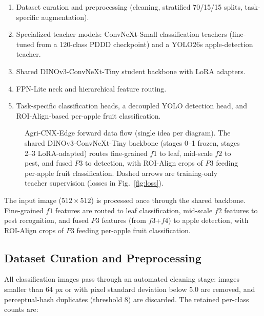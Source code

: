 \documentclass[preprint,12pt]{elsarticle}
\begin{document}
\begin{enumerate}

\item Dataset curation and preprocessing (cleaning, stratified
70/15/15 splits, task-specific augmentation).

\item Specialized teacher models: ConvNeXt-Small classification teachers
(fine-tuned from a 120-class PDDD checkpoint) and a YOLO26s
apple-detection teacher.

\item Shared DINOv3-ConvNeXt-Tiny student backbone with LoRA adapters.

\item FPN-Lite neck and hierarchical feature routing.

\item Task-specific classification heads, a decoupled YOLO detection
head, and ROI-Align-based per-apple fruit classification.

\end{enumerate}

\begin{figure}[H]
\centering
\resizebox{\textwidth}{!}{}
\caption{Agri-CNX-Edge forward data flow (single idea per diagram).
The shared DINOv3-ConvNeXt-Tiny backbone (stages 0--1 frozen, stages
2--3 LoRA-adapted) routes fine-grained $f1$ to leaf, mid-scale $f2$
to pest, and fused $P3$ to detection, with ROI-Align crops of $P3$
feeding per-apple fruit classification. Dashed arrows are
training-only teacher supervision (losses in Fig.~\ref{fig:loss}).}
\label{fig:arch}
\end{figure}

The input image ($512\times512$) is processed once through the shared
backbone. Fine-grained $f1$ features are routed to leaf classification,
mid-scale $f2$ features to pest recognition, and fused $P3$ features
(from $f3$+$f4$) to apple detection, with ROI-Align crops of $P3$
feeding per-apple fruit classification.


\subsection{Dataset Curation and Preprocessing}

All classification images pass through an automated cleaning stage:
images smaller than $64$ px or with pixel standard deviation below $5.0$
are removed, and perceptual-hash duplicates (threshold 8) are discarded.
The retained per-class counts are:
\end{document}
